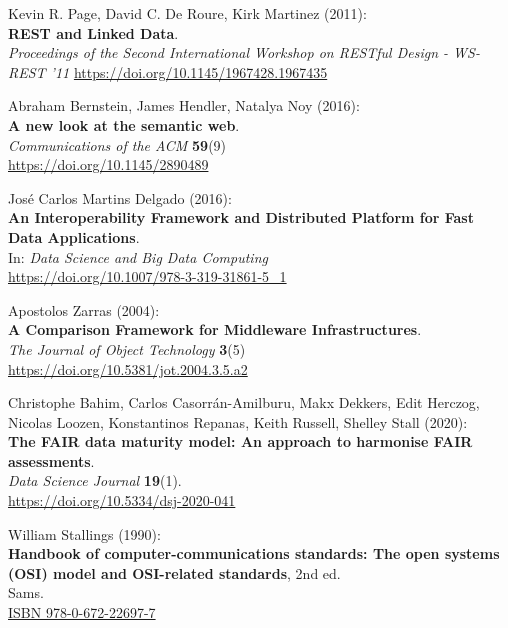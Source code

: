 \begin{thebibliography}{9}
Kevin R. Page, David C. De Roure, Kirk Martinez (2011): \\
\textbf{{REST} and {Linked Data}}. \\
\emph{Proceedings of the {Second International Workshop} on {RESTful Design} - {WS-REST} '11} 
\url{https://doi.org/10.1145/1967428.1967435}

Abraham Bernstein, James Hendler, Natalya Noy (2016): \\
\textbf{A new look at the semantic web}. \\
\emph{Communications of the ACM} \textbf{59}(9) \\
\url{https://doi.org/10.1145/2890489}

José Carlos Martins Delgado (2016): \\
\textbf{An Interoperability Framework and Distributed Platform for Fast Data Applications}.\\
In: \emph{Data {Science} and {Big Data Computing}} \\
\url{https://doi.org/10.1007/978-3-319-31861-5_1}

Apostolos Zarras (2004): \\
\textbf{A {Comparison Framework} for {Middleware Infrastructures}}. \\
\emph{The Journal of Object Technology} \textbf{3}(5) \\
\url{https://doi.org/10.5381/jot.2004.3.5.a2}

Christophe Bahim, Carlos Casorrán-Amilburu, Makx Dekkers, Edit Herczog,
Nicolas Loozen, Konstantinos Repanas, Keith Russell, Shelley Stall
(2020): \\
\textbf{The {FAIR} data maturity model: {An} approach to harmonise
{FAIR} assessments}. \\
\emph{Data Science Journal} \textbf{19}(1).\\
\url{https://doi.org/10.5334/dsj-2020-041}

William Stallings (1990): \\
\textbf{Handbook of computer-communications standards: {The} open systems ({OSI}) model and {OSI-related}
standards}, 2nd ed. \\
Sams.\\
\href{https://identifiers.org/isbn/9780672226977}{ISBN 978-0-672-22697-7}


\end{thebibliography}
